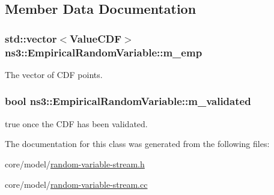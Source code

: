 \subsection{Member Data Documentation}
\subsubsection[{\texorpdfstring{m\+\_\+emp}{m_emp}}]{\setlength{\rightskip}{0pt plus 5cm}std\+::vector$<${\bf Value\+C\+DF}$>$ ns3\+::\+Empirical\+Random\+Variable\+::m\+\_\+emp\hspace{0.3cm}{\ttfamily [private]}}\hypertarget{classns3_1_1EmpiricalRandomVariable_aab4864cc028da8bb0c4bd8cfdd723fc7}{}\label{classns3_1_1EmpiricalRandomVariable_aab4864cc028da8bb0c4bd8cfdd723fc7}
The vector of C\+DF points. 
\subsubsection[{\texorpdfstring{m\+\_\+validated}{m_validated}}]{\setlength{\rightskip}{0pt plus 5cm}bool ns3\+::\+Empirical\+Random\+Variable\+::m\+\_\+validated\hspace{0.3cm}{\ttfamily [private]}}\hypertarget{classns3_1_1EmpiricalRandomVariable_aa3038da76db39faac73ceb5445791205}{}\label{classns3_1_1EmpiricalRandomVariable_aa3038da76db39faac73ceb5445791205}
{\ttfamily true} once the C\+DF has been validated. 

The documentation for this class was generated from the following files\+:\begin{DoxyCompactItemize}
\item 
core/model/\hyperlink{random-variable-stream_8h}{random-\/variable-\/stream.\+h}\item 
core/model/\hyperlink{random-variable-stream_8cc}{random-\/variable-\/stream.\+cc}\end{DoxyCompactItemize}
